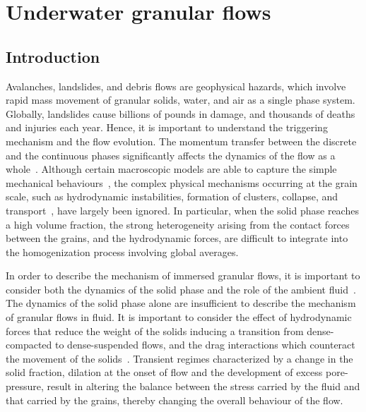 \chapter{Underwater granular flows}

\ifpdf
    \graphicspath{{Chapter6/figs/raster/}{Chapter6/figs/pdf/}{Chapter6/figs/}}
\else
    \graphicspath{{Chapter6/figs/vector/}{Chapter6/figs/}}
\fi

\section{Introduction}
Avalanches, landslides, and debris flows are geophysical hazards, which involve 
rapid mass movement of granular solids, water, and air as a single phase 
system. Globally, landslides cause billions of pounds in damage, and thousands 
of deaths and injuries each year. Hence, it is important to understand the 
triggering mechanism and the flow evolution. The momentum transfer between the 
discrete and the continuous phases significantly affects the dynamics of the 
flow 
as a whole~\citep{Topin2012}. Although certain macroscopic models are able to 
capture the simple mechanical behaviours~\citep{Peker2007}, the complex 
physical mechanisms occurring at the grain scale, such as hydrodynamic 
instabilities, 
formation of clusters, collapse, and transport~\citep{Topin2011}, have largely 
been ignored. In particular, when the solid phase reaches a high volume 
fraction, the strong heterogeneity arising from the contact forces between the 
grains, and the hydrodynamic forces, are difficult to integrate into the 
homogenization process involving global averages. 

In order to describe the mechanism of immersed 
granular flows, it is important to consider both the dynamics of the solid 
phase and the role of the ambient fluid~\citep{Denlinger2001}. The dynamics of 
the solid phase alone are insufficient to describe the mechanism of granular 
flows in fluid. It is important to consider the effect of hydrodynamic forces 
that reduce the weight of the solids inducing a transition from dense-compacted 
to dense-suspended flows, and the drag interactions which counteract the 
movement of the solids~\citep{Meruane2010}. Transient regimes characterized by 
a change in the solid fraction, dilation at the onset of flow and the 
development 
of excess pore-pressure, result in altering the balance between the stress 
carried by the fluid and that carried by the grains, thereby changing the 
overall behaviour of the flow. 


